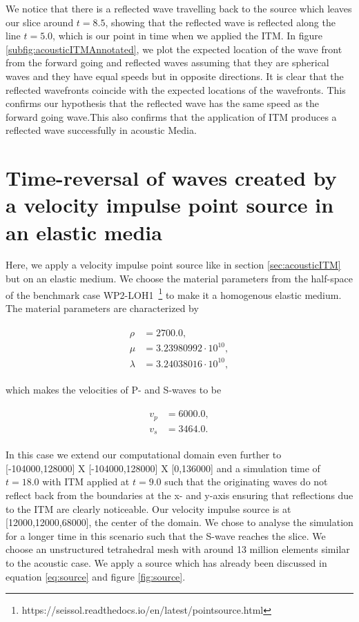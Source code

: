 We notice that there is a reflected wave travelling back to the source which leaves our slice around $t=8.5$, showing that the reflected wave
is reflected along the line $t=5.0$, which is our point in time when we applied the \ac{ITM}. In figure \ref{subfig:acousticITMAnnotated}, we plot the expected
location of the wave front from the forward going and reflected waves assuming that they are spherical waves and they have equal speeds but in opposite directions. 
It is clear that the reflected wavefronts coincide with the expected locations of the wavefronts. This confirms our hypothesis that the reflected wave has the same speed
as the forward going wave.This also confirms that the application of \ac{ITM} produces a reflected wave successfully in acoustic Media.

\section{Time-reversal of waves created by a velocity impulse point source in an elastic media} \label{sec:elasticITM}
Here, we apply a velocity impulse point source like in section \ref{sec:acousticITM} but on an elastic medium. We choose the material parameters from the half-space of the 
benchmark case WP2-LOH1~\footnote[1]{https://seissol.readthedocs.io/en/latest/pointsource.html} to make it a homogenous elastic medium. The material parameters 
are characterized by

\begin{align}
    \begin{split}
        \rho &=    2700.0 ,\\
        \mu &=     3.23980992 \cdot 10^{10} ,\\
        \lambda &= 3.24038016 \cdot 10^{10} ,
    \end{split}
\end{align}

which makes the velocities of P- and S-waves to be

\begin{align}
    \begin{split}
        v_p &= 6000.0 ,\\
        v_s &= 3464.0 .
    \end{split}
\end{align}

In this case we extend our computational domain even further to [-104000,128000] X [-104000,128000] X [0,136000] and a simulation time of $t=18.0$ with \ac{ITM} applied at $t=9.0$
such that the originating waves do not reflect back from the boundaries at the x- and y-axis ensuring that reflections due to the \ac{ITM} are clearly noticeable.
Our velocity impulse source is at [12000,12000,68000], the center of the domain.
We chose to analyse the simulation for a longer time in this scenario such that the S-wave reaches the slice. We choose an unstructured tetrahedral mesh with around 13 million elements similar to the acoustic case. 
We apply a source which has already been discussed in equation \ref{eq:source} and figure \ref{fig:source}. \\

